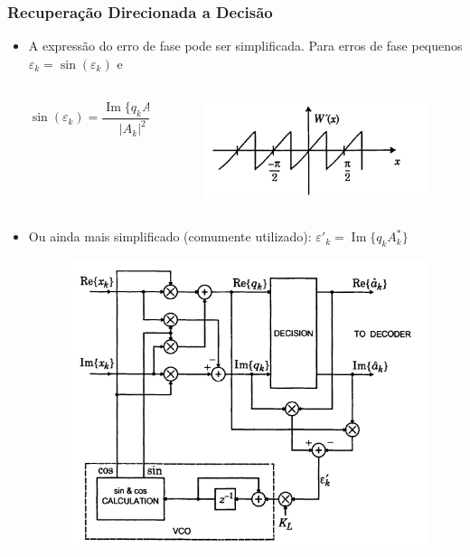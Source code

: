 \begin{frame}
	\frametitle{Recuperação Direcionada a Decisão}
	\begin{itemize}
		
		\item A expressão do erro de fase pode ser simplificada. Para erros de fase pequenos $\varepsilon_k=\sin(\varepsilon_k)$ e
		\vspace{-3.5ex}
		\begin{columns}
			\begin{column}{0.5\linewidth}
				\begin{equation*}
					\sin(\varepsilon_k)=\frac{\operatorname{Im}\{q_k A_k^*\}}{|A_k|^2}= W'
				\end{equation*}
			\end{column}
			\begin{column}{0.5\linewidth}
				\begin{figure}
					\includegraphics[width=0.7\columnwidth]{figs/fasedetec}
				\end{figure}
			\end{column}
		\end{columns}

		\item Ou ainda mais simplificado (comumente utilizado): $\varepsilon'_k=\operatorname{Im}\{q_k A_k^*\}$		
		\begin{figure}
			\includegraphics[width=0.45\columnwidth]{figs/realdd}
		\end{figure}
			
	\end{itemize}
\end{frame}


